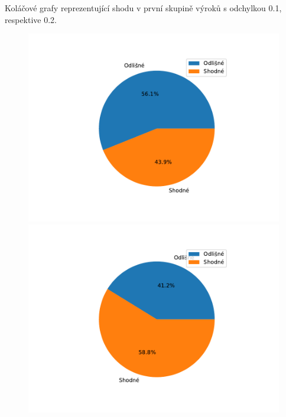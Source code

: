 \begin{graph}
Koláčové grafy reprezentující shodu v první skupině výrok\r u s odchylkou 0.1, respektive 0.2.
    \begin{figure}[H]
                \includegraphics[scale=0.5]{template-fig/group0.pdf}
                \includegraphics[scale=0.5]{template-fig/group00.pdf}
            \end{figure}
\end{graph}

